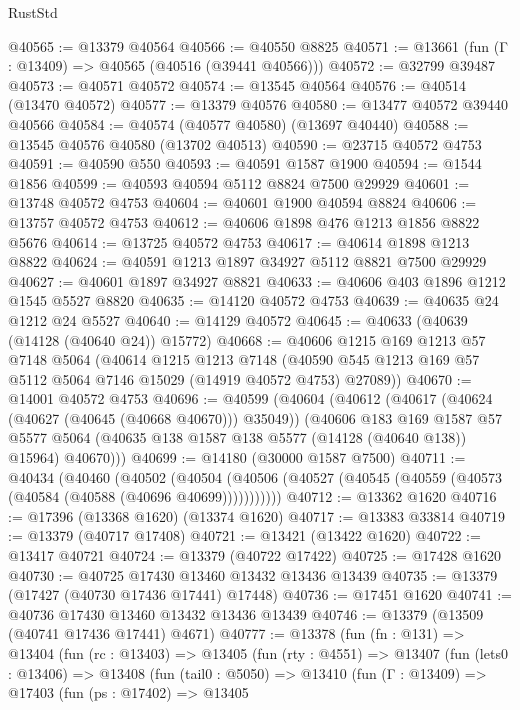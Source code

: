 \begin{lexlean}{RustStd}
\begin{coremodule}
@40565 := @13379 @40564
@40566 := @40550 @8825
@40571 := @13661 (fun (Γ : @13409) => @40565 (@40516 (@39441 @40566)))
@40572 := @32799 @39487
@40573 := @40571 @40572
@40574 := @13545 @40564
@40576 := @40514 (@13470 @40572)
@40577 := @13379 @40576
@40580 := @13477 @40572 @39440 @40566
@40584 := @40574 (@40577 @40580) (@13697 @40440)
@40588 := @13545 @40576 @40580 (@13702 @40513)
@40590 := @23715 @40572 @4753
@40591 := @40590 @550
@40593 := @40591 @1587 @1900
@40594 := @1544 @1856
@40599 := @40593 @40594 @5112 @8824 @7500 @29929
@40601 := @13748 @40572 @4753
@40604 := @40601 @1900 @40594 @8824
@40606 := @13757 @40572 @4753
@40612 := @40606 @1898 @476 @1213 @1856 @8822 @5676
@40614 := @13725 @40572 @4753
@40617 := @40614 @1898 @1213 @8822
@40624 := @40591 @1213 @1897 @34927 @5112 @8821 @7500 @29929
@40627 := @40601 @1897 @34927 @8821
@40633 := @40606 @403 @1896 @1212 @1545 @5527 @8820
@40635 := @14120 @40572 @4753
@40639 := @40635 @24 @1212 @24 @5527
@40640 := @14129 @40572
@40645 := @40633 (@40639 (@14128 (@40640 @24)) @15772)
@40668 := @40606
    @1215
    @169
    @1213
    @57
    @7148
    @5064
    (@40614
      @1215
      @1213
      @7148
      (@40590 @545 @1213 @169 @57 @5112 @5064 @7146 @15029 (@14919 @40572 @4753) @27089))
@40670 := @14001 @40572 @4753
@40696 := @40599
    (@40604
      (@40612
        (@40617 (@40624 (@40627 (@40645 (@40668 @40670))) @35049))
        (@40606
          @183
          @169
          @1587
          @57
          @5577
          @5064
          (@40635 @138 @1587 @138 @5577 (@14128 (@40640 @138)) @15964)
          @40670)))
@40699 := @14180 (@30000 @1587 @7500)
@40711 := @40434
    (@40460
      (@40502
        (@40504 (@40506 (@40527 (@40545 (@40559 (@40573 (@40584 (@40588 (@40696 @40699)))))))))))
@40712 := @13362 @1620
@40716 := @17396 (@13368 @1620) (@13374 @1620)
@40717 := @13383 @33814
@40719 := @13379 (@40717 @17408)
@40721 := @13421 (@13422 @1620)
@40722 := @13417 @40721
@40724 := @13379 (@40722 @17422)
@40725 := @17428 @1620
@40730 := @40725 @17430 @13460 @13432 @13436 @13439
@40735 := @13379 (@17427 (@40730 @17436 @17441) @17448)
@40736 := @17451 @1620
@40741 := @40736 @17430 @13460 @13432 @13436 @13439
@40746 := @13379 (@13509 (@40741 @17436 @17441) @4671)
@40777 := @13378
    (fun (fn : @131) =>
    @13404
      (fun (rc : @13403) =>
      @13405
        (fun (rty : @4551) =>
        @13407
          (fun (lets0 : @13406) =>
          @13408
            (fun (tail0 : @5050) =>
            @13410
              (fun (Γ : @13409) =>
              @17403
                (fun (ps : @17402) =>
                @13405

\end{coremodule}
\end{lexlean}
